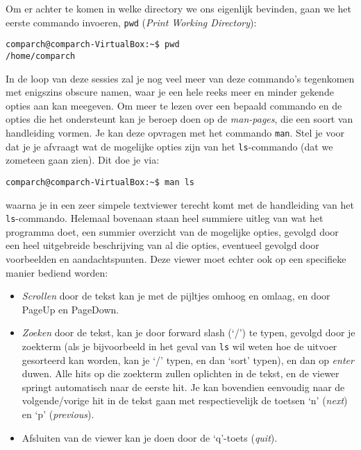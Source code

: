 \documentclass[a4paper,twoside,openany]{memoir}
\begin{document}
Om er achter te komen in welke directory we ons eigenlijk bevinden, gaan we het
eerste commando invoeren, \verb!pwd! (\emph{Print Working Directory}):

\begin{verbatim}
comparch@comparch-VirtualBox:~$ pwd
/home/comparch
\end{verbatim}

In de loop van deze sessies zal je nog veel meer van deze commando's tegenkomen
met enigszins obscure namen, waar je een hele reeks meer en minder gekende
opties aan kan meegeven. Om meer te lezen over een bepaald commando en de opties
die het ondersteunt kan je beroep doen op de \emph{man-pages}, die een soort van
handleiding vormen. Je kan deze opvragen met het commando \verb!man!. Stel je
voor dat je je afvraagt wat de mogelijke opties zijn van het \verb!ls!-commando
(dat we zometeen gaan zien). Dit doe je via:

\begin{verbatim}
comparch@comparch-VirtualBox:~$ man ls
\end{verbatim}
waarna je in een zeer simpele textviewer terecht komt met de handleiding van het
\verb!ls!-commando. Helemaal bovenaan staan heel summiere uitleg van wat het
programma doet, een summier overzicht van de mogelijke opties, gevolgd door een
heel uitgebreide beschrijving van al die opties, eventueel gevolgd door
voorbeelden en aandachtspunten. Deze viewer moet echter ook op een specifieke
manier bediend worden:

\begin{itemize}

  \item \emph{Scrollen} door de tekst kan je met de pijltjes omhoog en omlaag,
    en door PageUp en PageDown.

  \item \emph{Zoeken} door de tekst, kan je door forward slash (`/') te typen,
    gevolgd door je zoekterm (als je bijvoorbeeld in het geval van \verb!ls! wil
    weten hoe de uitvoer gesorteerd kan worden, kan je `/' typen, en
    dan `sort' typen), en dan op \emph{enter} duwen. Alle hits op die zoekterm
    zullen oplichten in de tekst,
    en de viewer springt automatisch naar de eerste hit. Je kan bovendien
    eenvoudig naar de volgende/vorige hit in de tekst gaan met respectievelijk
    de toetsen `n' (\emph{next}) en `p' (\emph{previous}).

  \item {Afsluiten} van de viewer kan je doen door de `q'-toets (\emph{quit}).

\end{itemize}
\end{document}
